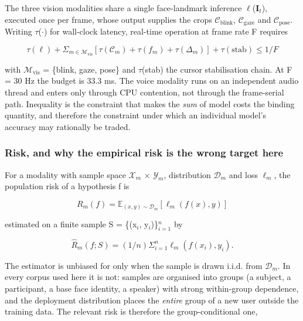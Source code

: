 The three vision modalities share a single face-landmark inference  $\ell$(\textbf{I}$_{t}$), executed once per frame, whose output supplies the crops $\mathcal{C}_{\mathrm{blink}}$, $\mathcal{C}_{\mathrm{gaze}}$ and $\mathcal{C}_{\mathrm{pose}}$. Writing $\tau$($\cdot$) for wall-clock latency, real-time operation at frame rate F requires

\begin{equation}
\label{eq:3}
\tau (\ell ) + \Sigma _{m \in \mathcal{M}_{\mathrm{vis}}} [ \tau (\mathcal{C}_m) + \tau (f_m) + \tau (\Delta _m) ] + \tau (\text{stab}) \leq 1 / F
\end{equation}

with $\mathcal{M}_{\mathrm{vis}}$ = \{blink, gaze, pose\} and $\tau$(stab) the cursor stabilisation chain. At F = 30 Hz the budget is 33.3 ms. The voice modality runs on an independent audio thread and enters  only through CPU contention, not through the frame-serial path. Inequality  is the constraint that makes the \emph{sum} of model costs the binding quantity, and therefore the constraint under which an individual model's accuracy may rationally be traded.

\subsubsection{Risk, and why the empirical risk is the wrong target here}

For a modality with sample space $\mathcal{X}_{m}$ $\times$ $\mathcal{Y}_{m}$, distribution $\mathcal{D}_{m}$ and loss $\ell_{m}$, the population risk of a hypothesis f is

\begin{equation}
\label{eq:4}
R_m(f) = \mathbb{E}_{(x,y) \sim \mathcal{D}_m} [ \ell _m(f(x), y) ]
\end{equation}

estimated on a finite sample S = \{(x$_{i}$, y$_{i}$)\}$_{i=1}^{n}$ by

\begin{equation}
\label{eq:5}
\hat{R}_m(f ; S) = (1/n) \Sigma _{i=1}^{n} \ell _m(f(x_{i}), y_{i}).
\end{equation}

The estimator  is unbiased for  only when the sample is drawn i.i.d. from $\mathcal{D}_{m}$. In every corpus used here it is not: samples are organised into groups (a subject, a participant, a base face identity, a speaker) with strong within-group dependence, and the deployment distribution places the \emph{entire} group of a new user outside the training data. The relevant risk is therefore the group-conditional one,

